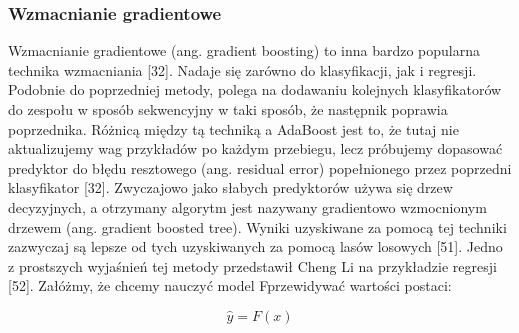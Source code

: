\subsubsection{Wzmacnianie gradientowe}
\label{cha:Wzmacnianie gradientowe}

Wzmacnianie gradientowe (ang. gradient boosting) to inna bardzo popularna technika wzmacniania [32]. Nadaje się zarówno do klasyfikacji, jak i regresji. Podobnie do poprzedniej metody, polega na dodawaniu kolejnych klasyfikatorów do zespołu w sposób sekwencyjny w taki sposób, że następnik poprawia poprzednika. Różnicą między tą techniką a AdaBoost jest to, że tutaj nie aktualizujemy wag przykładów po każdym przebiegu, lecz próbujemy dopasować predyktor do błędu resztowego (ang. residual error) popełnionego przez poprzedni klasyfikator [32]. Zwyczajowo jako słabych predyktorów używa się drzew decyzyjnych, a otrzymany algorytm jest nazywany gradientowo wzmocnionym drzewem (ang. gradient boosted tree). Wyniki uzyskiwane za pomocą tej techniki zazwyczaj są lepsze od tych uzyskiwanych za pomocą lasów losowych [51]. Jedno z prostszych wyjaśnień tej metody przedstawił Cheng Li na przykładzie regresji [52]. Załóżmy, że chcemy nauczyć model Fprzewidywać wartości postaci:

\begin{equation}
\hat y = F(x)
\end{equation}








































































